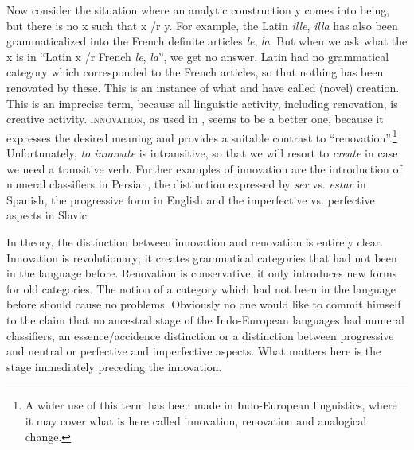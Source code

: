 Now consider the situation where an analytic construction y comes into being, but there is no x such that x /r y. For example, the Latin \textit{ille}, \textit{illa} has also been grammaticalized into the French definite articles \textit{le}, \textit{la}. But when we ask what the x is in ``Latin x /r French \textit{le}, \textit{la}'', we get no answer. Latin had no grammatical category which corresponded to the French articles, so that nothing has been renovated by these. This is an instance of what \citet{Meillet1915} and \citet{Traugott1980} have called (novel) creation. This is an imprecise term, because all linguistic activity, including renovation, is creative activity. \textsc{innovation}, as used in \citet{Benveniste1968}, seems to be a better one, because it expresses the desired meaning and provides a suitable contrast to ``renovation''.\footnote{A wider use of this term has been made in Indo-European linguistics, where it may cover what is here called innovation, renovation and analogical change.} Unfortunately, \textit{to innovate }is intransitive, so that we will resort to \textit{create} in case we need a transitive verb. Further examples of innovation are the introduction of numeral classifiers in Persian, the distinction expressed by \textit{ser} vs. \textit{estar} in Spanish, the progressive form in English and the imperfective vs. perfective aspects in Slavic.

In theory, the distinction between innovation and renovation is entirely clear. Innovation is revolutionary; it creates grammatical categories that had not been in the language before. Renovation is conservative; it only introduces new forms for old categories. The notion of a category which had not been in the language before should cause no problems. Obviously no one would like to commit himself to the claim that no ancestral stage of the Indo-European languages had numeral classifiers, an essence/accidence distinction or a distinction between progressive and neutral or perfective and imperfective aspects. What matters here is the stage immediately preceding the innovation.


